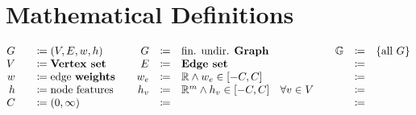 \documentclass{article}
\makeatletter
\newcommand{\Reals}{\mathbb{R}}
\newcommand{\defin}{\in}
\newenvironment{mathdef}{
    \[
    \begin{array}{@{}rcl@{\qquad}rcl@{\qquad}rcl@{}}
}{
    \end{array}
    \]
}
\makeatother
\begin{document}
\section*{Mathematical Definitions}

\begin{mathdef}
    \defitem
        {G}      {(V, E, w, h)}
        {G}      {\text{fin. undir. }\textbf{Graph}}
        {\mathbb{G}} {\{\text{all } G\}}
    
    \defitem
        {V}      {\textbf{Vertex set}}
        {E}      {\textbf{Edge set}}
        {\phantom{x}} {\phantom{x}}
    
    \defitem
        {w}      {\text{edge }\textbf{weights}}
        {w_e}    {\Reals \land w_e \defin [-C, C]}
        {\phantom{x}} {\phantom{x}}
    \defitem
        {h}      {\text{node features}} 
        {h_v}    {\Reals^m \land h_v \defin [-C, C] \quad \forall v \defin V}
        {\phantom{x}} {\phantom{x}}
    \defitem
        {C}      {(0, \infty)}
        {\phantom{x}}       {\phantom{x}}
        {\phantom{x}}       {\phantom{x}}
\end{mathdef}
\end{document}
